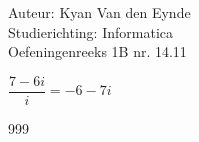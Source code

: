 \documentclass[a4paper]{article}
\begin{document}
  
\noindent \large Auteur: Kyan Van den Eynde \\
\noindent \large Studierichting: Informatica\\
\noindent \large Oefeningenreeks 1B nr. 14.11\\

\medskip

\normalsize

$\dfrac{7-6i}{i} = -6-7i$\\

\begin{thebibliography}{999}
\end{thebibliography}
\end{document}
